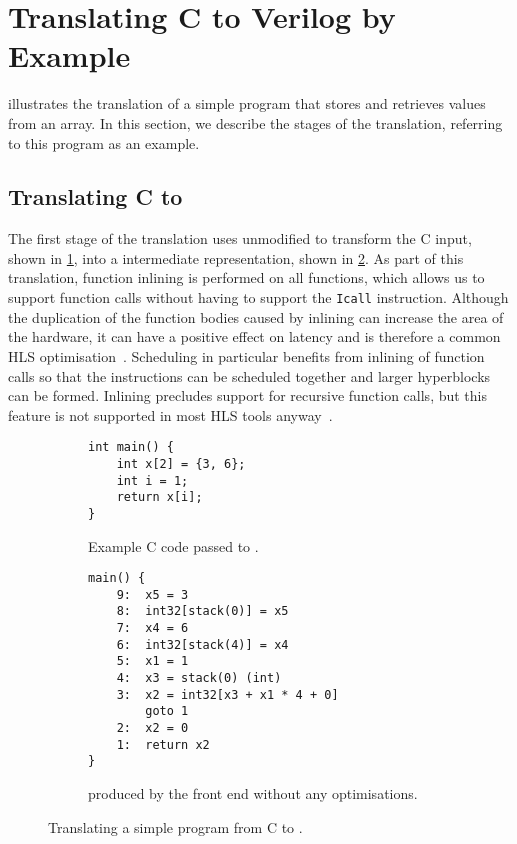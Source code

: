 \section{Translating C to Verilog by Example}%
\label{sec:itv:translating-c-to-verilog}

 illustrates the translation of a simple program
that stores and retrieves values from an array.  In this section, we describe
the stages of the \vericert{} translation, referring to this program as an
example.

\subsection{Translating C to \rtl{}}

The first stage of the translation uses unmodified \compcert{} to transform the
C input, shown in \cref{fig:accumulator_c}, into a \rtl{} intermediate
representation, shown in \cref{fig:accumulator_rtl}.  As part of this
translation, function inlining is performed on all functions, which allows us to
support function calls without having to support the \texttt{Icall} \rtl{}
instruction.  Although the duplication of the function bodies caused by inlining
can increase the area of the hardware, it can have a positive effect on latency
and is therefore a common HLS optimisation~\cite{noronha17_rapid_fpga}.
Scheduling in particular benefits from inlining of function calls so that the
instructions can be scheduled together and larger hyperblocks can be formed.
Inlining precludes support for recursive function calls, but this feature is not
supported in most HLS tools anyway~\cite{thomas16_srcht}.

\begin{figure}
  \centering
    \begin{subfigure}[b]{0.48\linewidth}
\begin{verbatim}
int main() {
    int x[2] = {3, 6};
    int i = 1;
    return x[i];
}
\end{verbatim}
      \caption{Example C code passed to \vericert{}.}\label{fig:accumulator_c}
    \end{subfigure}\hfill%
    \begin{subfigure}[b]{0.48\linewidth}
\begin{verbatim}
main() {
    9:  x5 = 3
    8:  int32[stack(0)] = x5
    7:  x4 = 6
    6:  int32[stack(4)] = x4
    5:  x1 = 1
    4:  x3 = stack(0) (int)
    3:  x2 = int32[x3 + x1 * 4 + 0]
        goto 1
    2:  x2 = 0
    1:  return x2
}
\end{verbatim}
      \caption{\rtl{} produced by the \compcert{} front end without any optimisations.}\label{fig:accumulator_rtl}
    \end{subfigure}
    \caption{Translating a simple program from C to \rtl{}.}\label{fig:accumulator_c_rtl}
\end{figure}

